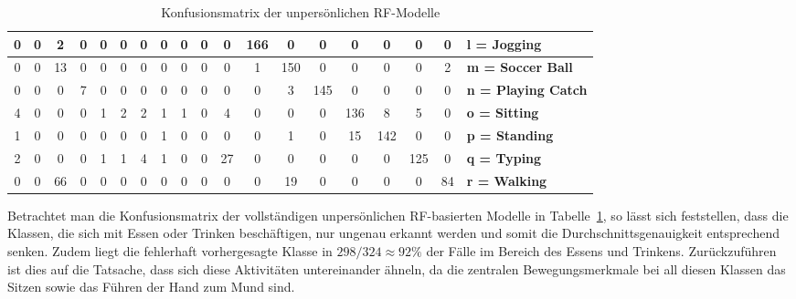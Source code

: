 \begin{table}
\begin{tabular}{|c|c|c|c|c|c|c|c|c|c|c|c|c|c|c|c|c|c||l|}
\hline 
0 & 0 & 2 & 0 & 0 & 0 & 0 & 0 & 0 & 0 & 0 & 166 & 0 & 0 & 0 & 0 & 0 & 0 & \textbf{l = Jogging} \\
\hline 
0 & 0 &13 & 0 & 0 & 0 & 0 & 0 & 0 & 0 & 0 & 1 & 150 & 0 & 0 & 0 & 0 & 2 & \textbf{m = Soccer Ball} \\
\hline 
0 & 0 & 0 & 7 & 0 & 0 & 0 & 0 & 0 & 0 & 0 & 0 & 3 & 145 & 0 & 0 & 0 & 0 & \textbf{n = Playing Catch} \\
\hline 
4 & 0 & 0 & 0 & 1 & 2 & 2 & 1 & 1 & 0 & 4 & 0 & 0 & 0 & 136 & 8 & 5 & 0 & \textbf{o = Sitting} \\
\hline 
1 & 0 & 0 & 0 & 0 & 0 & 0 & 1 & 0 & 0 & 0 & 0 & 1 & 0 &15 & 142 & 0 & 0 & \textbf{p = Standing} \\
\hline 
2 & 0 & 0 & 0 & 1 & 1 & 4 & 1 & 0 & 0 & 27 & 0 & 0 & 0 & 0 & 0 & 125 & 0 & \textbf{q = Typing} \\
\hline 
0 & 0 &66 & 0 & 0 & 0 & 0 & 0 & 0 & 0 & 0 & 0 & 19 & 0 & 0 & 0 & 0 & 84 & \textbf{r = Walking} \\
\hline 
\end{tabular}
\caption{Konfusionsmatrix der unpersönlichen RF-Modelle}
\label{tab:confusion-impersonal-rf}
\end{table}

Betrachtet man die Konfusionsmatrix der vollständigen unpersönlichen RF-basierten Modelle in Tabelle~\ref{tab:confusion-impersonal-rf}, so lässt sich feststellen, dass die Klassen, die sich mit Essen oder Trinken beschäftigen, nur ungenau erkannt werden und somit die Durchschnittsgenauigkeit entsprechend senken. Zudem liegt die fehlerhaft vorhergesagte Klasse in $298/324 \approx 92 \%$ der Fälle im Bereich des Essens und Trinkens. Zurückzuführen ist dies auf die Tatsache, dass sich diese Aktivitäten untereinander ähneln, da die zentralen Bewegungsmerkmale bei all diesen Klassen das Sitzen sowie das Führen der Hand zum Mund sind.

